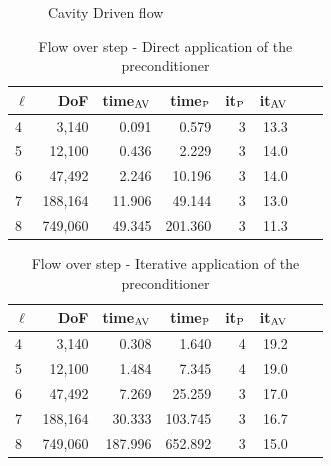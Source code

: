 \documentclass{article}
\begin{document}
\begin{figure}
    \centering

  \caption{Cavity Driven flow}
\end{figure}

\begin{table} \centering
    \begin{tabular}{lrrrrrll}
    \hline
    $\ell$ &     DoF &  time$_{\rm AV}$ &  time$_{\rm P}$ &  it$_{\rm P}$ & it$_{\rm AV}$ \\
    \hline
     4 &    3,140 & 0.091 & 0.579 & 3 & 13.3 & \\
     5 &   12,100 & 0.436 & 2.229 & 3 & 14.0 & \\
     6 &   47,492 & 2.246 & 10.196 & 3 & 14.0 & \\
     7 &  188,164 & 11.906 & 49.144 & 3 & 13.0 & \\
     8 &  749,060 & 49.345 & 201.360 & 3 & 11.3 & \\
    \hline
    \end{tabular}
    \caption{Flow over step - Direct application of the preconditioner}
\end{table}

\begin{table} \centering
    \begin{tabular}{lrrrrrll}
    \hline
    $\ell$ &     DoF &  time$_{\rm AV}$ &  time$_{\rm P}$ &  it$_{\rm P}$ & it$_{\rm AV}$ \\
    \hline
     4 &    3,140 & 0.308 & 1.640 & 4 & 19.2 \\
     5 &   12,100 & 1.484 & 7.345 & 4 & 19.0 \\
     6 &   47,492 & 7.269 & 25.259 & 3 & 17.0 \\
     7 &  188,164 & 30.333 & 103.745 & 3 & 16.7 \\
     8 &  749,060 & 187.996 & 652.892 & 3 & 15.0 \\

    \hline
    \end{tabular}
    \caption{Flow over step - Iterative application of the preconditioner}
\end{table}
\end{document}
